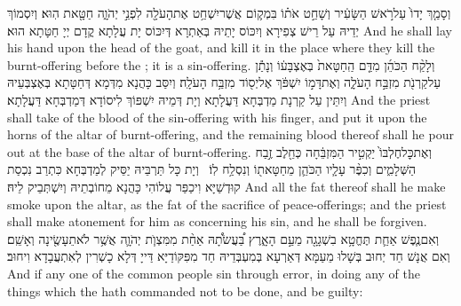 {וְסָמַ֤ךְ יָדוֹ֙ עַל\maqqaf רֹ֣אשׁ הַשָּׂעִ֔יר וְשָׁחַ֣ט אֹת֗וֹ בִּמְק֛וֹם אֲשֶׁר\maqqaf יִשְׁחַ֥ט אֶת\maqqaf הָעֹלָ֖ה לִפְנֵ֣י יְהֹוָ֑ה חַטָּ֖את הֽוּא׃}
{וְיִסְמוֹךְ יְדֵיהּ עַל רֵישׁ צְפִירָא וְיִכּוֹס יָתֵיהּ בְּאַתְרָא דְּיִכּוֹס יָת עֲלָתָא קֳדָם יְיָ חַטָּתָא הוּא׃}
{And he shall lay his hand upon the head of the goat, and kill it in the place where they kill the burnt-offering before the \lord; it is a sin-offering.}{}
{וְלָקַ֨ח הַכֹּהֵ֜ן מִדַּ֤ם הַֽחַטָּאת֙ בְּאֶצְבָּע֔וֹ וְנָתַ֕ן עַל\maqqaf קַרְנֹ֖ת מִזְבַּ֣ח הָעֹלָ֑ה וְאֶת\maqqaf דָּמ֣וֹ יִשְׁפֹּ֔ךְ אֶל\maqqaf יְס֖וֹד מִזְבַּ֥ח הָעֹלָֽה׃}
{וְיִסַּב כָּהֲנָא מִדְּמָא דְּחַטָּתָא בְּאֶצְבְּעֵיהּ וְיִתֵּין עַל קַרְנָת מַדְבְּחָא דַּעֲלָתָא וְיָת דְּמֵיהּ יִשְׁפּוֹךְ לִיסוֹדָא דְּמַדְבְּחָא דַּעֲלָתָא׃}
{And the priest shall take of the blood of the sin-offering with his finger, and put it upon the horns of the altar of burnt-offering, and the remaining blood thereof shall he pour out at the base of the altar of burnt-offering.}{}
{וְאֶת\maqqaf כׇּל\maqqaf חֶלְבּוֹ֙ יַקְטִ֣יר הַמִּזְבֵּ֔חָה כְּחֵ֖לֶב זֶ֣בַח הַשְּׁלָמִ֑ים וְכִפֶּ֨ר עָלָ֧יו הַכֹּהֵ֛ן מֵחַטָּאת֖וֹ וְנִסְלַ֥ח לֽוֹ׃ \petucha }
{וְיָת כָּל תַּרְבֵּיהּ יַסֵּיק לְמַדְבְּחָא כִּתְרַב נִכְסַת קוּדְשַׁיָּא וִיכַפַּר עֲלוֹהִי כָּהֲנָא מֵחוֹבְתֵיהּ וְיִשְׁתְּבֵיק לֵיהּ׃}
{And all the fat thereof shall he make smoke upon the altar, as the fat of the sacrifice of peace-offerings; and the priest shall make atonement for him as concerning his sin, and he shall be forgiven.}{}
{וְאִם\maqqaf נֶ֧פֶשׁ אַחַ֛ת תֶּחֱטָ֥א בִשְׁגָגָ֖ה מֵעַ֣ם הָאָ֑רֶץ בַּ֠עֲשֹׂתָ֠הּ אַחַ֨ת מִמִּצְוֺ֧ת יְהֹוָ֛ה אֲשֶׁ֥ר לֹא\maqqaf תֵעָשֶׂ֖ינָה וְאָשֵֽׁם׃}
{וְאִם אֲנָשׁ חַד יְחוּב בְּשָׁלוּ מֵעַמָּא דְּאַרְעָא בְּמִעְבְּדֵיהּ חַד מִפִּקּוֹדַיָּא דַּייָ דְּלָא כָשְׁרִין לְאִתְעֲבָדָא וִיחוּב׃}
{And if any one of the common people sin through error, in doing any of the things which the \lord\space hath commanded not to be done, and be guilty:}{}
